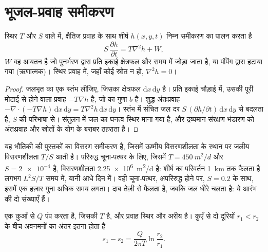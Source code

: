 \section{भूजल-प्रवाह समीकरण}\label{sec:b3:hydrogeology:flow-equation}

\begin{theorem}[भूजल-प्रवाह समीकरण]\label{thm:b3:hydrogeology:flow-equation}
स्थिर  $T$ और  $S$ वाले  में,
क्षैतिज प्रवाह के साथ शीर्ष $h(x, y, t)$ निम्न समीकरण का पालन करता है
\[
S\,\frac{\partial h}{\partial t} = T\nabla^2h + W ,
\]
$W$ वह आयतन है जो पुनर्भरण द्वारा प्रति इकाई क्षेत्रफल और समय में जोड़ा जाता है, या
पंपिंग द्वारा हटाया गया (ऋणात्मक)। स्थिर प्रवाह में, जहाँ कोई स्रोत न हो, $\nabla^2h =
0$।
\end{theorem}

\begin{proof}
जलभृत का एक स्तंभ लीजिए, जिसका क्षेत्रफल $\mathrm dx\,\mathrm dy$ है। प्रति
इकाई चौड़ाई में, उसकी पूरी मोटाई से होने वाला प्रवाह $-T\nabla h$ है, जो  का
गुणा $b$ है। शुद्ध अंतःप्रवाह $-\nabla\cdot(-T\nabla h)\,\mathrm dx\,\mathrm
dy = T\nabla^2h\,\mathrm dx\,\mathrm dy$। स्तंभ में संचित जल
दर $S\,(\partial h/\partial t)\,\mathrm dx\,\mathrm dy$ से बदलता है,
$S$ की परिभाषा से। संतुलन में जल का घनत्व स्थिर माना गया है, और
द्रव्यमान संरक्षण भंडारण को अंतःप्रवाह और स्रोतों के योग के बराबर ठहराता है।
\end{proof}

यह भौतिकी की पुस्तकों का विसरण समीकरण है, जिसमें ऊष्मीय विसरणशीलता के स्थान पर
जलीय विसरणशीलता $T/S$ आती है। परिरुद्ध चूना-पत्थर के लिए, जिसमें
$T = \qty{450}{m^2/d}$ और $S = \num{2e-4}$ है, विसरणशीलता
\qty{2.25e6}{m^2/d} है: शीर्ष का परिवर्तन \qty{1}{km} तक फैलता है
लगभग $L^2S/T$ समय में, यानी आधे दिन में। वही चूना-पत्थर, अपरिरुद्ध होने पर, $S =
0.2$ के साथ, इसमें एक हज़ार गुना अधिक समय लगता। दाब तेज़ी से फैलता है, जबकि
जल धीरे चलता है: ये आरंभ की दो संख्याएँ हैं।

\begin{proposition}[कुएँ की ओर स्थिर अरीय प्रवाह]\label{prop:b3:hydrogeology:thiem}
एक कुआँ  से $Q$ पंप करता है, जिसकी  $T$ है, और प्रवाह
स्थिर और अरीय है। कुएँ से दो दूरियों $r_1 < r_2$ के बीच
अवनमनों का अंतर इतना होता है
\[
s_1 - s_2 = \frac{Q}{2\pi T}\ln\frac{r_2}{r_1} .
\]
\end{proposition}

